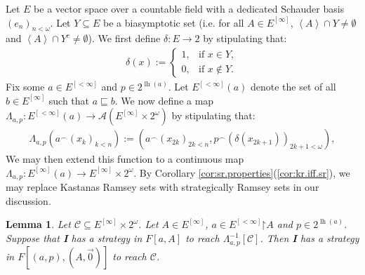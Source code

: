 \documentclass[11pt,reqno]{amsart}
\theoremstyle{plain}
\numberwithin{equation}{section}
\newtheorem{lemma}[theorem]{Lemma}
\theoremstyle{definition}
\newcommand{\func}{\operatorname}
\renewcommand{\c}[1]{\left\langle #1 \right\rangle}
\newcommand{\cal}{\mathcal}
\newcommand{\restrictedto}{\mathord{\upharpoonright}}
\newcommand{\lh}{\func{lh}}
\begin{document}
Let $E$ be a vector space over a countable field with a dedicated Schauder basis $(e_n)_{n<\omega}$. Let $Y \subseteq E$ be a biasymptotic set (i.e. for all $A \in E^{[\infty]}$, $\c{A} \cap Y \neq \emptyset$ and $\c{A} \cap Y^c \neq \emptyset$). We first define $\delta : E \to 2$ by stipulating that:
\begin{align*}
    \delta(x) := 
    \begin{cases}
        1, &\text{if $x \in Y$}, \\
        0, &\text{if $x \notin Y$}.
    \end{cases}
\end{align*}
Fix some $a \in E^{[<\infty]}$ and $p \in 2^{\lh(a)}$. Let $E^{[<\infty]}(a)$ denote the set of all $b \in E^{[\infty]}$ such that $a \sqsubseteq b$. We now define a map $\Lambda_{a,p} : E^{[<\infty]}(a) \to \cal{A}(E^{[\infty]} \times 2^\omega)$ by stipulating that:
\begin{align*}
    \Lambda_{a,p}(a^\frown(x_k)_{k<n}) := (a^\frown(x_{2k})_{2k<n},p^\frown(\delta(x_{2k+1}))_{2k+1<\omega}),
\end{align*}
We may then extend this function to a continuous map $\Lambda_{a,p} : E^{[\infty]}(a) \to E^{[\infty]} \times 2^\omega$. By Corollary \ref{cor:sr.properties}(\ref{cor:kr.iff.sr}), we may replace Kastanas Ramsey sets with strategically Ramsey sets in our discussion.

\begin{lemma}
\label{lem:coding.preserves.F}
    Let $\cal{C} \subseteq E^{[\infty]} \times 2^\omega$. Let $A \in E^{[\infty]}$, $a \in E^{[<\infty]}\restrictedto A$ and $p \in 2^{\lh(a)}$. Suppose that \textbf{I} has a strategy in $F[a,A]$ to reach $\Lambda_{a,p}^{-1}[\cal{C}]$. Then \textbf{I} has a strategy in $F[(a,p),(A,\vec{0})]$ to reach $\cal{C}$.
\end{lemma}
\end{document}
